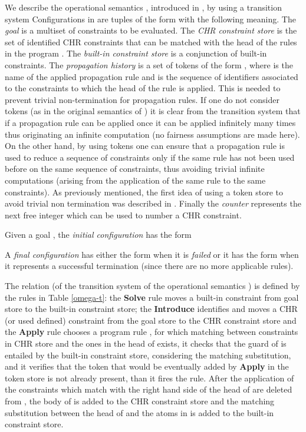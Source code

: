 \documentclass[final]{acmtrans2e}
\begin{document}
We describe the operational semantics , introduced in
\cite{DSGH04}, by using a transition system
 Configurations in  are
tuples of the form  with the
following meaning. The \emph{goal}  is a multiset of constraints to
be evaluated. The \emph{CHR constraint store}  is the set of
identified CHR constraints that can be matched with the head of the
rules in the program . The \emph{built-in constraint store}  is a
conjunction of built-in constraints. The {\em propagation history}
 is a set of tokens of the form , where 
is the name of the applied propagation rule and  is the
sequence of identifiers associated to the constraints to which the
head of the rule is applied. This is needed to prevent trivial
non-termination for propagation rules. If one do not consider
tokens (as in the original semantics of \cite{Fru98}) it is clear
from the transition system that if a propagation rule can be
applied once it can be applied infinitely many times thus
originating an infinite computation (no fairness assumptions are
made here). On the other hand, by using tokens one can ensure that
a propagation rule is used to reduce a sequence of constraints
only if the same rule has not been used before on the same
sequence of constraints, thus avoiding trivial infinite
computations (arising from the application of the same rule to the
same constraints). As previously mentioned, the first idea of using
a token store to avoid trivial non termination was described in
\cite{Abd97}. Finally the \emph{counter}  represents the next
free integer which can be used to number a CHR constraint.


Given a goal , the  {\em initial configuration} has the form

A {\em final configuration} has either the form  when it is {\em failed} or it
has the form  when it
represents a successful termination (since there are no more
applicable rules).


The relation  (of the transition system
of the operational semantics ) is defined  by the rules
in Table \ref{omega-t}: the \textbf{Solve} rule moves a
built-in constraint from goal store to the built-in constraint
store; the \textbf{Introduce} identifies and moves a CHR (or used
defined) constraint from the goal store to the CHR constraint
store and the \textbf{Apply} rule chooses a program rule , for
which matching between constraints in CHR store and the ones in
the head of  exists, it checks that the guard of  is
entailed by the built-in constraint store, considering the
matching substitution, and it verifies that the token that would be
eventually added by \textbf{Apply} in the token store is not already
present, than it fires the rule. After the application of 
the constraints which match with the right hand side of the head
of  are deleted from , the body of  is added to
the CHR constraint store and the matching substitution between
the head of  and the atoms in  is added to the
built-in constraint store.
\end{document}
